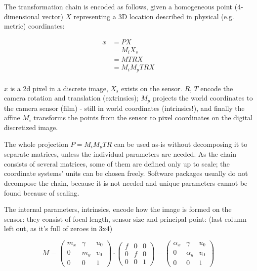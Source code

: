 The transformation chain is encoded as follows, given a homogeneous point (4-dimensional vector) $X$ representing a 3D location described in physical (e.g. metric) coordinates:

\begin{align}
	x &= P X\\
	  &= M_i X_s\\ %
	  &= M T R X\\
	  &= M_i M_p T R X\\ %
\end{align}

$x$ is a 2d pixel in a discrete image, $X_s$ exists on the sensor. $R$, $T$ encode the camera rotation and translation (extrinsics); $M_p$ projects the world coordinates to the camera sensor (film) - still in world coordinates (intrinsics!), and finally the affine $M_i$ transforms the points from the sensor to pixel coordinates on the digital discretized image.

The whole projection $P = M_i M_p T R$ can be used as-is without decomposing it to separate matrices, unless the individual parameters are needed. As the chain consists of several matrices, some of them are defined only up to scale; the coordinate systems' units can be chosen freely. Software packages usually do not decompose the chain, because it is not needed and unique parameters cannot be found because of scaling.


The internal parameters, intrinsics, encode how the image is formed on the sensor: they consist of focal length, sensor size and principal point: (last column left out, as it's full of zeroes in 3x4)

\begin{equation}
	M =
	\begin{pmatrix}
		m_x & \gamma & u_0\\
		0   &    m_y & v_0\\
		0   &        0 & 1
	\end{pmatrix}
\cdot
	\begin{pmatrix}
		f & 0 & 0\\
		0 & f & 0\\
		0 & 0 & 1
	\end{pmatrix}
	=
	\begin{pmatrix}
		\alpha_x & \gamma   & u_0\\
		0        & \alpha_y & v_0\\
		0        & 0        & 1
	\end{pmatrix}
\end{equation}

